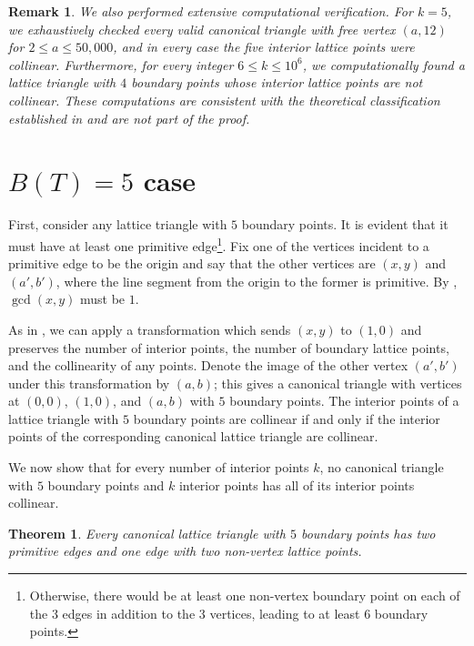 \documentclass{article}
\theoremstyle{mydefstyle}
\newtheorem{theorem}{Theorem}
\newtheorem*{remark}{Remark}
\begin{document}
\begin{remark}
We also performed extensive computational verification. For $k=5$, we exhaustively checked every valid canonical triangle with free vertex $(a,12)$ for $2 \le a \le 50,\!000$, and in every case the five interior lattice points were collinear. Furthermore, for every integer $6 \le k \le 10^6$, we computationally found a lattice triangle with $4$ boundary points whose interior lattice points are not collinear. These computations are consistent with the theoretical classification established in  and are not part of the proof.
\end{remark}

\section{$B(T)=5$ case}

First, consider any lattice triangle with $5$ boundary points. It is evident that it must have at least one primitive edge\footnote{Otherwise, there would be at least one non-vertex boundary point on each of the $3$ edges in addition to the $3$ vertices, leading to at least $6$ boundary points.}. Fix one of the vertices incident to a primitive edge to be the origin and say that the other vertices are $(x,y)$ and $(a',b')$, where the line segment from the origin to the former is primitive. By , $\gcd(x,y)$ must be $1$. 

As in , we can apply a transformation which sends $(x,y)$ to $(1,0)$ and preserves the number of interior points, the number of boundary lattice points, and the collinearity of any points. Denote the image of the other vertex $(a',b')$ under this transformation by $(a,b)$; this gives a canonical triangle with vertices at $(0,0)$, $(1,0)$, and $(a,b)$ with $5$ boundary points. The interior points of a lattice triangle with $5$ boundary points are collinear if and only if the interior points of the corresponding canonical lattice triangle are collinear. 

We now show that for every number of interior points $k$, no canonical triangle with $5$ boundary points and $k$ interior points has all of its interior points collinear. 

\begin{theorem}
Every canonical lattice triangle with $5$ boundary points has two primitive edges and one edge with two non-vertex lattice points. 
\end{theorem}
\end{document}
